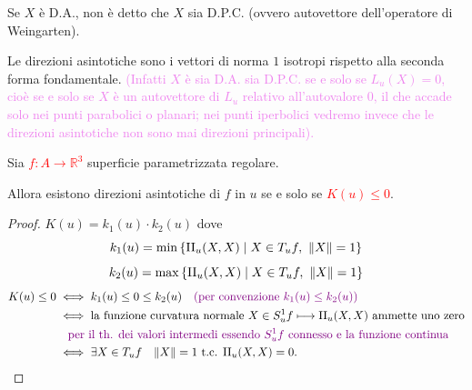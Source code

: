         \begin{osservazione}
        \mbox{}

        Se $X$ è D.A., non è detto che $X$ sia D.P.C. (ovvero autovettore dell'operatore di Weingarten).

        Le direzioni asintotiche sono i vettori di norma $1$ isotropi rispetto alla seconda forma fondamentale. \textcolor{violet}{(Infatti $X$ è sia D.A. sia D.P.C. se e solo se $L_u(X) = 0$, cioè se e solo se $X$ è un autovettore di $L_u$ relativo all'autovalore $0$, il che accade solo nei punti parabolici o planari; nei punti iperbolici vedremo invece che le direzioni asintotiche non sono mai direzioni principali).}
        \end{osservazione}
        \begin{proposizione}
        \label{prop:esistenza_direzioni_asintotiche}
        Sia \textcolor{red}{$f : A \to \mathbb{R}^3$} superficie parametrizzata regolare.
        
        Allora esistono direzioni asintotiche di $f$ in $u$ se e solo se \textcolor{red}{$K(u) \le 0$}.
        \end{proposizione}

        \begin{proof}
        $K(u) = k_1(u) \cdot k_2(u)$ dove
        \[
        k_1(u) = \min \left\{ \mathrm{II}_u(X,X) \;\middle|\; X \in T_u f, \ \lVert X\rVert = 1 \right\}
        \]
        \[
        k_2(u) = \max \left\{ \mathrm{II}_u(X,X) \;\middle|\; X \in T_u f, \ \lVert X\rVert = 1 \right\}
        \]
        \begin{align*}
        K(u) \le 0 &\iff k_1(u) \le 0 \le k_2(u) \quad \textcolor{violet}{(\text{per convenzione } k_1(u) \le k_2(u))} \\
        &\iff \text{la funzione curvatura normale } X \in S_u^1 f \longmapsto \mathrm{II}_u(X,X) \text{ ammette uno zero} \\
        &\quad \textcolor{violet}{\text{per il th. dei valori intermedi essendo } S_u^1 f \text{ connesso e la funzione continua}} \\
        &\iff \exists X \in T_u f \quad \lVert X\rVert = 1 \text{ t.c. } \mathrm{II}_u(X,X) = 0.
        \end{align*}
        \end{proof}
        \newpage

